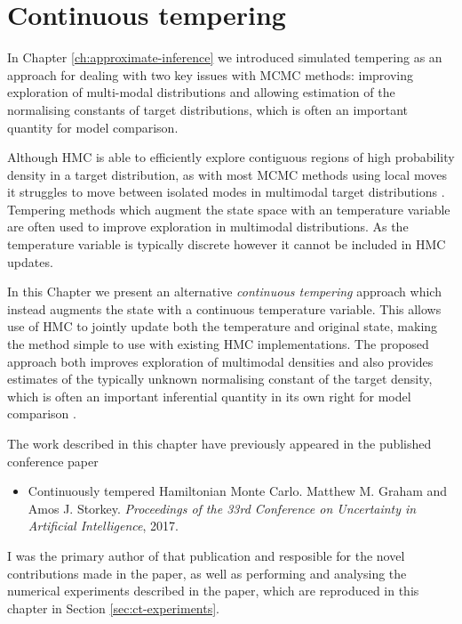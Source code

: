\chapter{Continuous tempering}\label{ch:continuous-tempering}

In Chapter \ref{ch:approximate-inference} we introduced simulated tempering as an approach for dealing with two key issues with \ac{MCMC} methods: improving exploration of multi-modal distributions and allowing estimation of the normalising constants of target distributions, which is often an important quantity for model comparison.

Although \ac{HMC} is able to efficiently explore contiguous regions of high probability density in a target distribution, as with most \ac{MCMC} methods using local moves it struggles to move between isolated modes in multimodal target distributions \citep{neal2011mcmc}. Tempering methods \citep{swendsen1986replica,geyer1991markov,marinari1992simulated} which augment the state space with an temperature variable are often used to improve exploration in multimodal distributions. As the temperature variable is typically discrete however it cannot be included in \ac{HMC} updates.

In this Chapter we present an alternative \emph{continuous tempering} approach which instead augments the state with a continuous temperature variable. This allows use of \ac{HMC} to jointly update both the temperature and original state, making the method simple to use with existing \ac{HMC} implementations. The proposed approach both improves exploration of multimodal densities and also provides estimates of the typically unknown normalising constant of the target density, which is often an important inferential quantity in its own right for model comparison \citep{gelman1998simulating}.

The work described in this chapter have previously appeared in the published conference paper
\begin{itemize}
 \item Continuously tempered Hamiltonian Monte Carlo. Matthew M. Graham and Amos J. Storkey. \emph{Proceedings of the 33rd Conference on Uncertainty in Artificial Intelligence}, 2017.
\end{itemize}
I was the primary author of that publication and resposible for the novel contributions made in the paper, as well as performing and analysing the numerical experiments described in the paper, which are reproduced in this chapter in Section \ref{sec:ct-experiments}.


